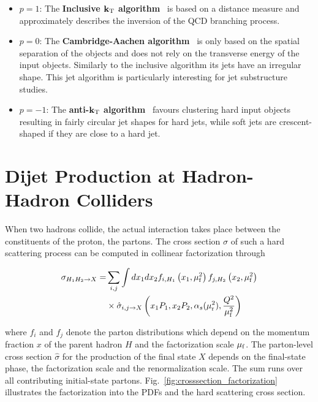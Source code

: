 \begin{itemize}
    \item $p=1$: The \textbf{Inclusive $\mathbf{k_{\mathrm{T}}}$
    algorithm}~\cite{Catani:1991hj,Catani:1992rm} is based on a \ptsq
        distance measure and approximately describes the inversion
        of the QCD branching process.
    \item $p=0$: The \textbf{Cambridge-Aachen
        algorithm}~\cite{Dokshitzer:1997in} is only based on the spatial
        separation of the objects and does not rely on the transverse energy of
        the input objects. Similarly to the inclusive \kt algorithm its jets
        have an irregular shape. This jet algorithm is particularly interesting
        for jet substructure studies.
    \item  $p=-1$: The \textbf{anti-$\mathbf{k_{\mathrm{T}}}$
    algorithm}~\cite{Cacciari:2008gp} favours clustering hard input objects
    resulting in fairly circular jet shapes for hard jets, while soft jets are
    crescent-shaped if they are close to a hard jet.
\end{itemize}

\section{Dijet Production at Hadron-Hadron Colliders}

When two hadrons collide, the actual interaction takes place between the
constituents of the proton, the partons. The cross section $\sigma$ of such a hard
scattering process can be computed in collinear factorization through

\begin{equation*}
    \begin{split}
    \sigma_{H_1 H_2 \rightarrow X} = &\sum_{i,j} \int dx_1 dx_2 f_{i, H_1}
    \left(x_1, \mu_{\mathrm{f}}^2 \right) f_{j,H_2} \left(x_2, \mu_{\mathrm{f}}^2 \right) \\ 
    &\times \hat\sigma_{i,j \rightarrow X} \left( x_1 P_1, x_2P_2, \alpha_{s}(\mu_{\mathrm{r}}^2),
    \frac{Q^2}{\mu_{\mathrm{f}}^2} \right)
\end{split}
\end{equation*}

where $f_i$ and $f_j$ denote the parton distributions which depend on the
momentum fraction $x$ of the parent hadron $H$ and the factorization scale
$\mu_{\mathrm{f}}$. The parton-level cross section $\hat \sigma$ for the production of the
final state $X$ depends on the final-state phase, the factorization scale and
the renormalization scale. The sum runs over all contributing initial-state
partons. Fig.~\ref{fig:crosssection_factorization} illustrates the factorization
into the PDFs and the hard scattering cross section.

